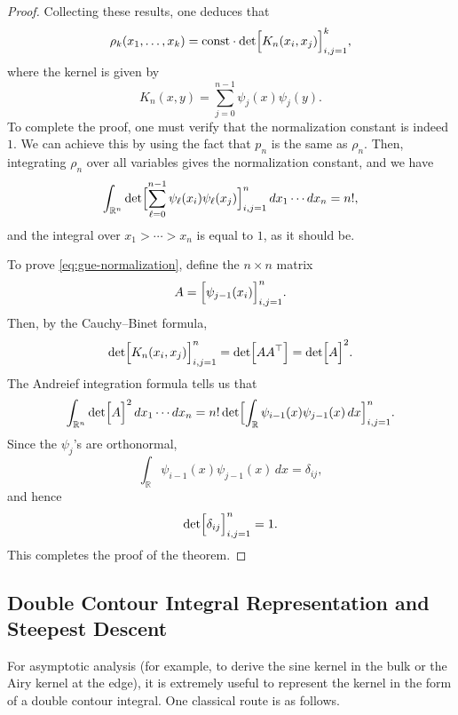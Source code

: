 \documentclass[letterpaper,11pt,oneside,reqno]{article}
\numberwithin{equation}{section}
\theoremstyle{definition}
\begin{document}
\begin{proof}
Collecting these results, one deduces that
\[
\rho_k(x_1,\dots,x_k)=
\mathrm{const}\cdot
\det\Bigl[K_n(x_i,x_j)\Bigr]_{i,j=1}^k,
\]
where the kernel is given by
\[
K_n(x,y)=\sum_{j=0}^{n-1}\psi_j(x)\psi_j(y).
\]
To complete the proof, one must verify that the normalization constant is indeed $1$.
We can achieve this by using the fact that $p_n$ is the same as $\rho_n$.
Then, integrating $\rho_n$ over all variables gives the normalization constant,
and we have
\begin{equation}
	\label{eq:gue-normalization}
	\int_{\mathbb{R}^n} \det\Bigl[\sum_{\ell=0}^{n-1}\psi_\ell(x_i)\psi_\ell(x_j)\Bigr]_{i,j=1}^n \,dx_1\cdots dx_n = n!,
\end{equation}
and the integral over $x_1>\cdots>x_n$ is equal to $1$, as it should be.

To prove \eqref{eq:gue-normalization},
define the \(n\times n\) matrix
\[
A=\Bigl[\psi_{j-1}(x_i)\Bigr]_{i,j=1}^n.
\]
Then, by the Cauchy--Binet formula,
\[
\det\Bigl[K_n(x_i,x_j)\Bigr]_{i,j=1}^n = \det\Bigl[AA^\top\Bigr]
=\det\Bigl[A\Bigr]^2.
\]
The Andreief integration formula tells us that
\[
\int_{\mathbb{R}^n} \det\Bigl[A\Bigr]^2\,dx_1\cdots dx_n = n! \det\Bigl[\int_{\mathbb{R}} \psi_{i-1}(x)\psi_{j-1}(x)\,dx\Bigr]_{i,j=1}^n.
\]
Since the \(\psi_j\)'s are orthonormal,
\[
\int_{\mathbb{R}} \psi_{i-1}(x)\psi_{j-1}(x)\,dx = \delta_{ij},
\]
and hence
\[
\det\Bigl[\delta_{ij}\Bigr]_{i,j=1}^n = 1.
\]
This completes the proof of the theorem.
\end{proof}



\subsection{Double Contour Integral Representation and Steepest Descent}
For asymptotic analysis (for example, to derive the sine kernel in the bulk or the Airy kernel at the edge), it is extremely useful to represent the kernel in the form of a double contour integral. One classical route is as follows.
\end{document}
